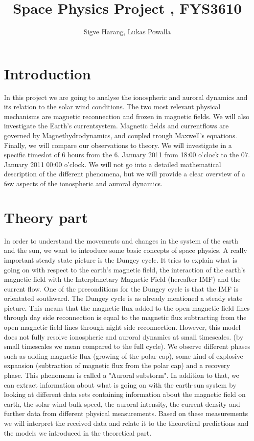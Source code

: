 \documentclass[10pt,a4paper]{article}
\author{Sigve Harang, Lukas Powalla}
\title{Space Physics Project , FYS3610}
\begin{document}
\maketitle
\newpage
\tableofcontents
\newpage
\section*{Introduction}
In this project we are going to analyse the ionospheric and auroral dynamics and its relation to the solar wind conditions. 
The two most relevant physical mechanisms are magnetic reconnection and frozen in magnetic fields. We will also investigate the Earth's currentsystem. Magnetic fields and 
currentflows are governed by Magnethydrodynamics, and coupled trough Maxwell's equations. Finally, we will compare our observations to theory. 
We will investigate in a specific timeslot of 6 hours from the 6. January 2011 from 18:00 o'clock to the 07. January 2011 00:00 o'clock. We will not go into a detailed mathematical
description of the different phenomena, but we will provide a clear overview of a few aspects of the ionospheric and auroral dynamics.
\section{Theory part} 
In order to understand the movements and changes in the system of the earth and the sun, we want to introduce some basic concepts of space physics.
A really important steady state picture is the Dungey cycle. It tries to explain what is going on with respect to the earth's magnetic field, the interaction of the earth's
magnetic field with the Interplanetary Magnetic Field (hereafter IMF) and the current flow. One of the preconditions for the Dungey cycle is that the IMF is orientated 
southward. The Dungey cycle is as already mentioned a steady state picture. This means that the magnetic flux added to the open magnetic field lines through day side 
reconnection is equal to the magnetic flux subtracting from the open magnetic field lines through night side reconnection. However, this model does not fully resolve ionospheric 
and auroral dynamics at small timescales. (by small timescales we mean compared to the full cycle). We observe different phases such as adding magnetic flux (growing of 
the polar cap), some kind of explosive expansion 
(subtraction of magnetic flux from the polar cap) and a recovery phase. This phenomena is called a "Auroral substorm". In addition to that, we can extract information 
about what is going on with the earth-sun system by looking at different data sets containing information about the magnetic field on earth, the solar wind bulk speed, 
the auroral intensity, the current density and further data from different physical measurements. Based on these measurements we will interpret the received data and relate 
it to the theoretical predictions and the models we introduced in the theoretical part.
\end{document}
